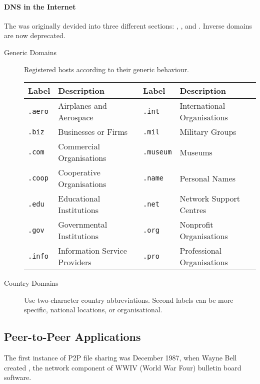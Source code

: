 \documentclass[\main/notes.tex]{subfiles}
\begin{document}
					\paragraph{DNS in the Internet} The  was originally devided into three different sections: , , and . Inverse domains are now deprecated.
					\begin{indentparagraph}
						\begin{description}
							\item[Generic Domains] Registered hosts according to their generic behaviour.
								\begin{center}
									\begin{tabular}{llll}
										Label & Description & Label & Description\\
										\midrule
										\texttt{.aero} & Airplanes and Aerospace       & \texttt{.int}    & International Organisations\\
										\texttt{.biz}  & Businesses or Firms           & \texttt{.mil}    & Military Groups\\
										\texttt{.com}  & Commercial Organisations      & \texttt{.museum} & Museums\\
										\texttt{.coop} & Cooperative Organisations     & \texttt{.name}   & Personal Names\\
										\texttt{.edu}  & Educational Institutions      & \texttt{.net}    & Network Support Centres\\
										\texttt{.gov}  & Governmental Institutions     & \texttt{.org}    & Nonprofit Organisations\\
										\texttt{.info} & Information Service Providers & \texttt{.pro}    & Professional Organisations
									\end{tabular}
								\end{center}
							\item[Country Domains] Use two-character country abbreviations. Second labels can be more specific, national locations, or organisational.
						\end{description}
					\end{indentparagraph}

			\subsection{Peer-to-Peer Applications}
				The first instance of P2P file sharing was December 1987, when Wayne Bell created , the network component of WWIV (World War Four) bulletin board software.
\end{document}
